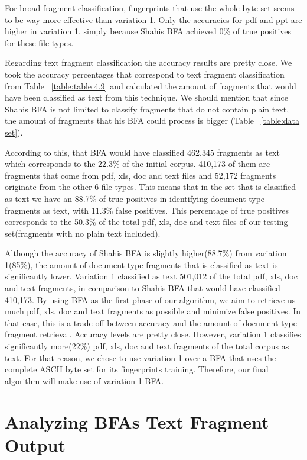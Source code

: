 
  
 For broad fragment classification, fingerprints that use the whole byte set seems to be way more effective than variation 1. Only the accuracies for pdf and ppt are higher in variation 1, simply because Shahis BFA achieved 0\% of true positives for these file types.
 
Regarding text fragment classification the accuracy results are pretty close. We took the accuracy percentages that correspond to text fragment classification from Table ~\ref{table:table 4.9} and calculated the amount of fragments that would have been classified as text from this technique. We should mention that since Shahis BFA is not limited to classify fragments that do not contain plain text, the amount of fragments that his BFA could process is bigger (Table ~\ref{table:data set}).

 According to this, that BFA would have classified 462,345 fragments as text which corresponds to the 22.3\% of the initial corpus. 410,173 of them are fragments that come from pdf, xls, doc and text files and 52,172 fragments originate from the other 6 file types. This means that in the set that is classified as text we have an 88.7\% of true positives in identifying document-type fragments as text, with 11.3\% false positives. This percentage of true positives corresponds to the 50.3\% of the total pdf, xls, doc and text files of our testing set(fragments with no plain text included).
 
Although the accuracy of Shahis BFA is slightly higher(88.7\%) from variation 1(85\%), the amount of document-type fragments that is classified as text is significantly lower. Variation 1 classified as text 501,012 of the total pdf, xls, doc and text fragments, in comparison to Shahis BFA that would have classified 410,173. By using BFA as the first phase of our algorithm, we aim to retrieve us much pdf, xls, doc and text fragments as possible and minimize false positives. In that case, this is a trade-off between accuracy and the amount of document-type fragment retrieval. Accuracy levels are pretty close. However, variation 1 classifies significantly more(22\%) pdf, xls, doc and text fragments of the total corpus as text. For that reason, we chose to use variation 1 over a BFA that uses the complete ASCII byte set for its fingerprints training. Therefore, our final algorithm will make use of variation 1 BFA.
 
\section{Analyzing BFAs Text Fragment Output} 

